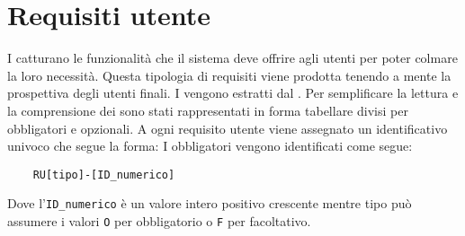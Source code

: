\section{Requisiti utente}
\label{sec:requisiti_utente}
I  catturano le funzionalità che il sistema deve offrire agli utenti per poter colmare la loro necessità.
Questa tipologia di requisiti viene prodotta tenendo a mente la prospettiva degli utenti finali.
I  vengono estratti dal .
Per semplificare la lettura e la comprensione dei  sono stati rappresentati in forma tabellare divisi per  obbligatori e  opzionali.
A ogni requisito utente viene assegnato un identificativo univoco che segue la forma:
I  obbligatori vengono identificati come segue:
\begin{lstlisting}
    RU[tipo]-[ID_numerico]
\end{lstlisting}
Dove l'\lstinline{ID_numerico} è un valore intero positivo crescente mentre tipo può assumere i valori \lstinline{O} per obbligatorio o \lstinline{F} per facoltativo.



